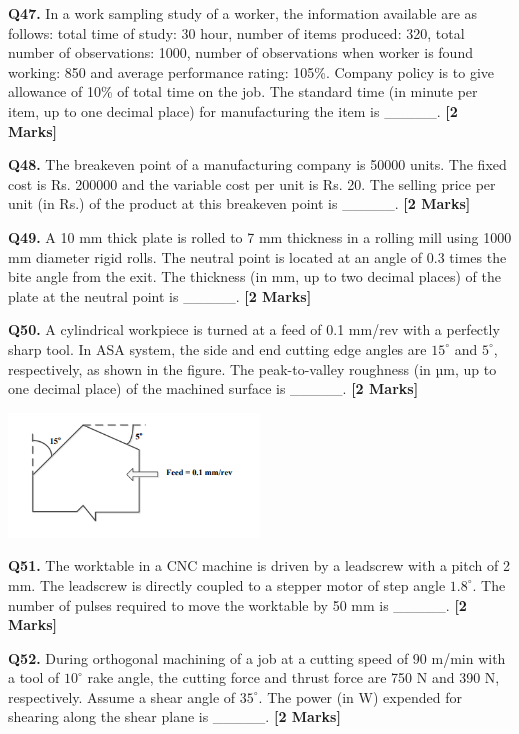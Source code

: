 \documentclass[11pt]{article}
\newcommand{\questionb}[2]{
    \noindent\textbf{Q#2.} #1 \hfill \textbf{[2 Marks]}
}
\begin{document}
\questionb{In a work sampling study of a worker, the information available are as follows: total time of study: 30 hour, number of items produced: 320, total number of observations: 1000, number of observations when worker is found working: 850 and average performance rating: 105\%. Company policy is to give allowance of 10\% of total time on the job. The standard time (in minute per item, up to one decimal place) for manufacturing the item is \_\_\_\_\_.}{47}
\vspace{0.5cm}

\questionb{The breakeven point of a manufacturing company is 50000 units. The fixed cost is Rs. 200000 and the variable cost per unit is Rs. 20. The selling price per unit (in Rs.) of the product at this breakeven point is \_\_\_\_\_.}{48}
\vspace{0.5cm}

\questionb{A 10 mm thick plate is rolled to 7 mm thickness in a rolling mill using 1000 mm diameter rigid rolls. The neutral point is located at an angle of 0.3 times the bite angle from the exit. The thickness (in mm, up to two decimal places) of the plate at the neutral point is \_\_\_\_\_.}{49}
\vspace{0.5cm}

\questionb{A cylindrical workpiece is turned at a feed of 0.1 mm/rev with a perfectly sharp tool. In ASA system, the side and end cutting edge angles are \(15^\circ\) and \(5^\circ\), respectively, as shown in the figure. The peak-to-valley roughness (in µm, up to one decimal place) of the machined surface is \_\_\_\_\_.}{50}
\begin{center}
\includegraphics[width=0.5\textwidth]{figures/50.png}
\end{center}
\vspace{0.5cm}

\questionb{The worktable in a CNC machine is driven by a leadscrew with a pitch of 2 mm. The leadscrew is directly coupled to a stepper motor of step angle \(1.8^\circ\). The number of pulses required to move the worktable by 50 mm is \_\_\_\_\_.}{51}
\vspace{0.5cm}

\questionb{During orthogonal machining of a job at a cutting speed of 90 m/min with a tool of \(10^\circ\) rake angle, the cutting force and thrust force are 750 N and 390 N, respectively. Assume a shear angle of \(35^\circ\). The power (in W) expended for shearing along the shear plane is \_\_\_\_\_.}{52}
\vspace{0.5cm}
\end{document}
